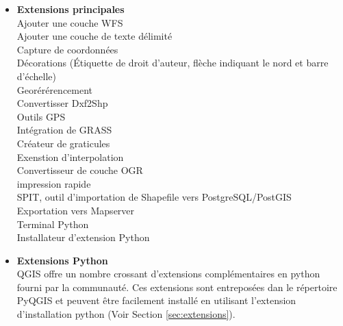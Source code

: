 \begin{itemize}
\item \textbf{Extensions principales}
\\  Ajouter une couche WFS 
\\ Ajouter une couche de texte d\'elimit\'e
\\ Capture de coordonn\'ees
\\ D\'ecorations (\'Etiquette de droit d'auteur, fl\`eche indiquant le nord et barre d'\'echelle)
\\ Geor\'er\'erencement
\\ Convertisser Dxf2Shp 
\\ Outils GPS 
\\ Int\'egration de GRASS
\\ Cr\'eateur de graticules
\\ Exenstion d'interpolation
\\ Convertisseur de couche OGR
\\ impression rapide
\\ SPIT, outil d'importation de Shapefile vers PostgreSQL/PostGIS
\\ Exportation vers Mapserver
\\ Terminal Python
\\ Installateur d'extension Python
\\ \item \textbf{Extensions Python}
\\ QGIS offre un nombre crossant d'extensions compl\'ementaires en python fourni par la communaut\'e. Ces extensions sont entrepos\'ees dan le r\'epertoire PyQGIS et peuvent \^etre facilement install\'e en utilisant l'extension d'installation python (Voir Section \ref{sec:extensions}).
\end{itemize}
